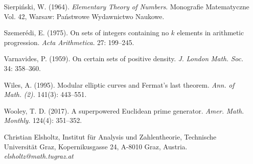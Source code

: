 \documentclass[12pt]{article}
\theoremstyle{theorem}
\theoremstyle{definition}
\begin{document}
\begin{thebibliography}{99}
Sierpi\'{n}ski, W. (1964).
\textit{Elementary Theory of Numbers}.
Monografie Matematyczne Vol.  42, Warsaw: 
Pa\'{n}stwowe Wydawnictwo Naukowe. 

Szemer\'{e}di, E. (1975).
On sets of integers containing no $k$ elements in arithmetic progression.
\textit{Acta Arithmetica.} 27: 199--245.

Varnavides, P. (1959).
On certain sets of positive density.
\textit{J. London Math. Soc.} 34: 358--360. 

Wiles, A. (1995). Modular elliptic curves and Fermat's last theorem.
\textit{Ann. of Math. (2).} 141(3): 443--551. 

Wooley, T. D. (2017).
A superpowered Euclidean prime generator.
\textit{Amer. Math. Monthly.} 124(4): 351--352. 
\end{thebibliography}


  
\begin{affil}
Christian Elsholtz, Institut f\"ur Analysis und Zahlentheorie,
Technische Universit\"at Graz,
Kopernikusgasse 24,
A-8010 Graz, Austria.\\
{\it elsholtz@math.tugraz.at}
\end{affil}
\end{document}

